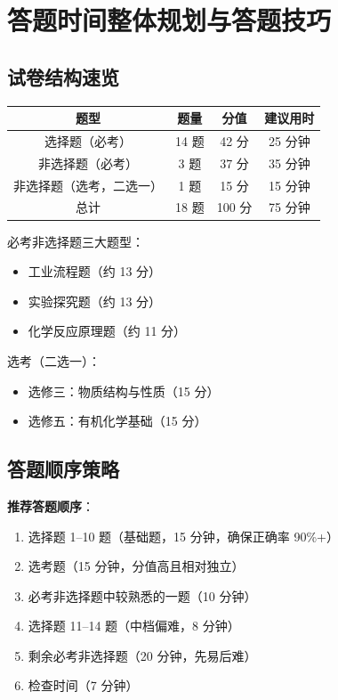 \section{答题时间整体规划与答题技巧}

\subsection{试卷结构速览}

\begin{center}
\begin{tabular}{c|c|c|c}
\textbf{题型} & \textbf{题量} & \textbf{分值} & \textbf{建议用时} \\ \hline
选择题（必考） & 14 题 & 42 分 & 25 分钟 \\
非选择题（必考） & 3 题 & 37 分 & 35 分钟 \\
非选择题（选考，二选一） & 1 题 & 15 分 & 15 分钟 \\ \hline
总计 & 18 题 & 100 分 & 75 分钟
\end{tabular}
\end{center}

必考非选择题三大题型：
\begin{itemize}
  \item 工业流程题（约 13 分）
  \item 实验探究题（约 13 分）
  \item 化学反应原理题（约 11 分）
\end{itemize}

选考（二选一）：
\begin{itemize}
  \item 选修三：物质结构与性质（15 分）
  \item 选修五：有机化学基础（15 分）
\end{itemize}

\subsection{答题顺序策略}

\textbf{推荐答题顺序}：
\begin{enumerate}
  \item 选择题 1--10 题（基础题，15 分钟，确保正确率 90\%+）
  \item 选考题（15 分钟，分值高且相对独立）
  \item 必考非选择题中较熟悉的一题（10 分钟）
  \item 选择题 11--14 题（中档偏难，8 分钟）
  \item 剩余必考非选择题（20 分钟，先易后难）
  \item 检查时间（7 分钟）
\end{enumerate}

